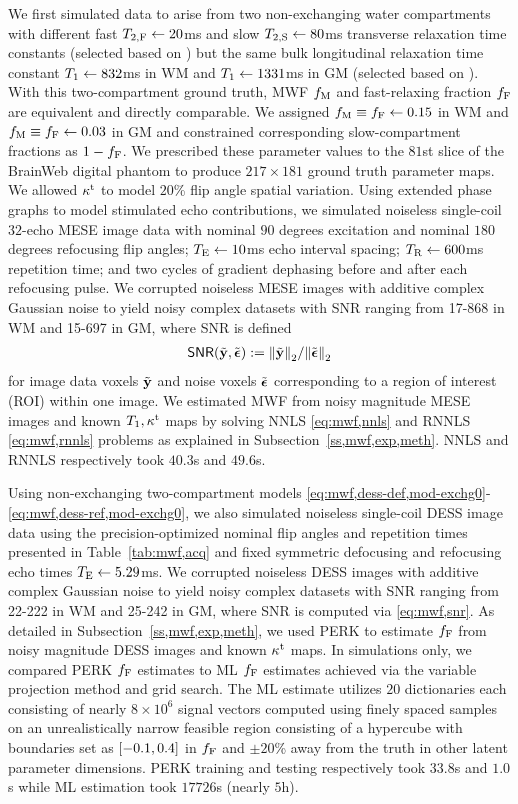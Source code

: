 We first simulated data 
to arise from two non-exchanging water compartments
with different fast $T_{2,\mathrm{F}} \gets 20$ms
and slow $T_{2,\mathrm{S}} \gets 80$ms
transverse relaxation time constants
(selected based on \cite{mackay:94:ivv,deoni:11:com})
but the same bulk longitudinal relaxation time constant
$T_1 \gets 832$ms in WM
and $T_1 \gets 1331$ms in GM
(selected based on \cite{wansapura:99:nrt}).
With this two-compartment ground truth, 
MWF $f_\mathrm{M}$ and fast-relaxing fraction $f_{\mathrm{F}}$
are equivalent and directly comparable.
We assigned 
$f_\mathrm{M} \equiv f_{\mathrm{F}} \gets 0.15$ in WM
and 
$f_\mathrm{M} \equiv f_{\mathrm{F}} \gets 0.03$ in GM
and constrained corresponding slow-compartment fractions
as $1-f_{\mathrm{F}}$.
We prescribed these parameter values
to the $81$st slice
of the BrainWeb digital phantom \cite{collins:98:dac}
to produce $217 \times 181$ ground truth parameter maps.
We allowed $\kappa^{\mathrm{t}}$ to model $20$\% flip angle spatial variation.
Using extended phase graphs 
to model stimulated echo contributions,
we simulated noiseless single-coil $32$-echo MESE image data
with nominal $90$ degrees excitation 
and nominal $180$ degrees refocusing flip angles;
$T_\mathrm{E} \gets 10$ms echo interval spacing; 
$T_\mathrm{R} \gets 600$ms repetition time;
and two cycles of gradient dephasing 
before and after each refocusing pulse.
We corrupted noiseless MESE images
with additive complex Gaussian noise
to yield noisy complex datasets
with SNR ranging 
from 17-868 in WM
and 15-697 in GM,
where SNR is defined
\begin{align}
	\snr{\bmyt,\bmepst} := \norm{\bmyt}_2/\norm{\bmepst}_2
  \label{eq:mwf,snr}
\end{align}
for image data voxels $\tilde{\mathbf{y}}$ and noise voxels $\tilde{\boldsymbol{\epsilon}}$
corresponding to a region of interest (ROI)
within one image.
We estimated MWF 
from noisy magnitude MESE images
and known $T_1,\kappa^{\mathrm{t}}$ maps
by solving NNLS \eqref{eq:mwf,nnls}
and RNNLS \eqref{eq:mwf,rnnls} problems
as explained in Subsection~\ref{ss,mwf,exp,meth}.
NNLS and RNNLS respectively took $40.3$s and $49.6$s.

Using non-exchanging two-compartment models 
\eqref{eq:mwf,dess-def,mod-exchg0}-\eqref{eq:mwf,dess-ref,mod-exchg0},
we also simulated noiseless single-coil DESS image data
using the precision-optimized nominal flip angles and repetition times
presented in Table~\ref{tab:mwf,acq}
and fixed symmetric defocusing and refocusing echo times $T_\mathrm{E} \gets 5.29$ms.
We corrupted noiseless DESS images
with additive complex Gaussian noise
to yield noisy complex datasets
with SNR ranging
from 22-222 in WM 
and 25-242 in GM,
where SNR is computed via \eqref{eq:mwf,snr}.
As detailed in Subsection~\ref{ss,mwf,exp,meth},
we used PERK to estimate $f_{\mathrm{F}}$
from noisy magnitude DESS images
and known $\kappa^{\mathrm{t}}$ maps.
In simulations only,
we compared PERK $f_{\mathrm{F}}$ estimates
to ML $f_{\mathrm{F}}$ estimates
achieved via the variable projection method \cite{golub:03:snl}
and grid search.
The ML estimate utilizes $20$ dictionaries 
each consisting of nearly $8 \times 10^6$ signal vectors
computed using finely spaced samples
on an unrealistically narrow feasible region
consisting of a hypercube
with boundaries set 
as $\brac{-0.1,0.4}$ in $f_{\mathrm{F}}$ 
and $\pm 20$\% away from the truth
in other latent parameter dimensions.
PERK training and testing respectively took $33.8$s and $1.0$s
while ML estimation took $17726$s (nearly $5$h).

